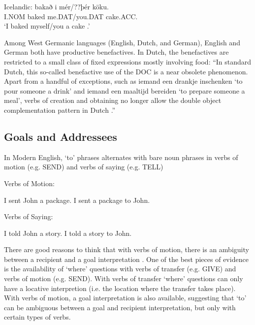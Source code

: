 \documentclass[11pt]{upenndiss}
\begin{document}
\begin{exe}
	\ex Icelandic:
	 bakað i {mér/??þér} {köku.}\\
	I.NOM baked me.DAT/you.DAT cake.ACC.\\
	\trans `I baked myself/you a cake \citep[4.155]{Thrainsson.2007}.'
\end{exe}


Among West Germanic languages (English, Dutch, and German), English and German both have productive benefactives. In Dutch, the benefactives are restricted to a small class of fixed expressions mostly involving food: 
``In standard Dutch, this so-called benefactive use of the DOC is a near obsolete phenomenon. Apart from a handful of exceptions, such as iemand een drankje inschenken ‘to pour someone a drink’ and iemand een maaltijd bereiden ‘to prepare someone a meal’, verbs of creation and obtaining no longer allow the double object complementation pattern in Dutch \citep{Colleman.2009}.''

\subsection{Goals and Addressees}

In Modern English, `to' phrases alternates with bare noun phrases in verbs of motion (e.g. SEND) and verbs of saying (e.g. TELL)

\begin{exe}
	\ex Verbs of Motion:
	\begin{xlist}
		\ex I sent John a package.
		\ex I sent a package to John.
	\end{xlist}
	\ex Verbs of Saying:
	\begin{xlist}
		\ex I told John a story.
		\ex I told a story to John.
	\end{xlist}
\end{exe}

There are good reasons to think that with verbs of motion, there is an ambiguity between a recipient and a goal interpretation \citep{Levinson.2005,Hovav.2008}. One of the best pieces of evidence is the availability of `where' questions with verbs of transfer (e.g. GIVE) and verbs of motion (e.g. SEND). With verbs of transfer `where' questions can only have a locative interpretion (i.e. the location where the transfer takes place). With verbs of motion, a goal interpretation is also available, suggesting that `to' can be ambiguous between a goal and recipient interpretation, but only with certain types of verbs.
\end{document}
